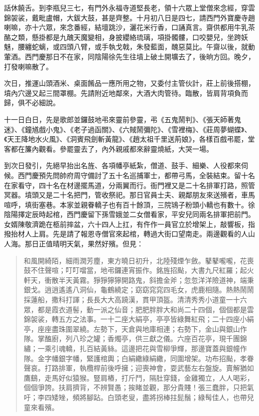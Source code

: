 話休饒舌。到李瓶兒三七，有門外永福寺道堅長老，領十六眾上堂僧來念經，穿雲錦袈裟，戴毗盧帽，大鈸大鼓，甚是齊整。十月初八日是四七，請西門外寶慶寺趙喇嘛，亦十六眾，來念番經，結壇跳沙，灑花米行香，口誦真言。齋供都用牛乳茶酪之類，懸掛都是九醜天魔變相，身披纓絡琉璃，項掛髑髏，口咬嬰兒，坐跨妖魅，腰纏蛇螭，或四頭八臂，或手執戈戟，朱發藍面，醜惡莫比。午齋以後，就動葷酒。西門慶那日不在家，同陰陽徐先生往墳上破土開壙去了，後晌方回。晚夕，打發喇嘛散了。

次日，推運山頭酒米、桌面餚品一應所用之物，又委付主管伙計，莊上前後搭棚，墳內穴邊又起三間罩棚。先請附近地鄰來，大酒大肉管待。臨散，皆肩背項負而歸，俱不必細說。

十一日白日，先是歌郎並鑼鼓地弔來靈前參靈，弔《五鬼鬧判》、《張天師著鬼迷》、《鐘馗戲小鬼》、《老子過函關》、《六賊鬧彌陀》、《雪裡梅》、《莊周夢蝴蝶》、《天王降地水火風》、《洞賓飛劍斬黃龍》、《趙太祖千里送荊娘》，各樣百戲弔罷，堂客都在簾內觀看。參罷靈去了，內外親戚都來辭靈燒紙，大哭一場。

到次日發引，先絕早抬出名旌、各項幡亭紙紮，僧道、鼓手、細樂、人役都來伺候。西門慶預先問帥府周守備討了五十名巡捕軍士，都帶弓馬，全裝結束。留十名在家看守，四十名在材邊擺馬道，分兩翼而行。衙門裡又是二十名排軍打路，照管冥器。墳頭又是二十名把門，管收祭祀。那日官員士夫、親鄰朋友來送殯者，車馬喧呼，填街塞巷。本家並親眷轎子也有百十餘頂，三院鴇子粉頭小轎也有數十。徐陰陽擇定辰時起棺，西門慶留下孫雪娥並二女僧看家，平安兒同兩名排軍把前門。女婿陳敬濟跪在柩前摔盆，六十四人上扛，有仵作一員官立於增架上，敲響板，指撥抬材人上肩。先是請了報恩寺僧官來起棺，轉過大街口望南走。兩邊觀看的人山人海。那日正值晴明天氣，果然好殯。但見：
\begin{quote}
和風開綺陌，細雨潤芳塵，東方曉日初升，北陸殘煙乍斂。鼕鼕嚨嚨，花喪鼓不住聲喧；叮叮噹當，地弔鑼連宵振作。銘旌招颭，大書九尺紅羅；起火軒天，衝散半天黃霧。猙猙獰獰開路鬼，斜擔金斧；忽忽洋洋險道神，端秉銀戈。逍逍遙遙八洞仙，龜鶴繞定；窈窈窕窕四毛女，虎鹿相隨。熱熱鬧鬧採蓮船，撒科打諢；長長大大高蹺漢，貫甲頂盔。清清秀秀小道童一十六眾，都是霞衣道髻，動一派之仙音；肥肥胖胖大和尚二十四個，個個都是雲錦袈裟，轉五方之法事。一十二座大絹亭，亭亭皆綠舞紅飛；二十四座小絹亭，座座盡珠圍翠繞。左勢下，天倉與地庫相連；右勢下，金山與銀山作隊。掌醢廚，列八珍之罐；香燭亭，供三獻之儀。六座百花亭，現千團錦繡；一乘引魂轎，扎百結黃絲。這邊把花與雪柳爭輝，那邊寶蓋與銀幢作隊。金字幡銀字幡，緊護棺輿；白絹繖綠絹繖，同圍增架。功布招颭，孝眷聲哀。打路排軍，執欖桿前後呼擁；迎喪神會，耍武藝左右盤旋。賣解猶如鷹鷂，走馬好似猿猴。豎肩樁，打斤鬥，隔肚穿錢，金雞獨立，人人喝彩，個個爭誇。扶肩擠背，不辨賢愚；挨睹並觀，那分貴賤！張三蠢胖，只把氣吁；李四矮矬，頻將腳跕。白頭老叟，盡將拐棒拄髭鬚；綠髩佳人，也帶兒童來看殯。
\end{quote}

